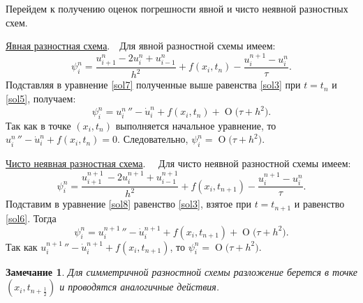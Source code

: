\documentclass[11pt,a4paper,twoside]{report}
\numberwithin{equation}{section}
\theoremstyle{definition}
\theoremstyle{plain}
\newtheorem*{note*}{Замечание}
\newcommand{\bigO}[1]{\ensuremath{\operatorname{O}\bigl(#1\bigr)}}
\begin{document}
\begin{solution}
    \noindent
    Перейдем к получению оценок погрешности явной и чисто неявной разностных схем.

    \underline{Явная разностная схема}.~~Для явной разностной схемы имеем:
    \begin{equation}
        \label{sol7}
        \psi^n_i = \frac{u^{n}_{i+1}-2u^n_i + u^n_{i-1}}{h^2} +
        f(x_i,t_n) - \frac{u^{n+1}_{i}-u^n_i}{\tau}.
    \end{equation}
    Подставляя в уравнение \eqref{sol7} полученные выше равенства \eqref{sol3}
    при $t = t_n$ и \eqref{sol5}, получаем:
    $$
        \psi^n_i = {u^{n~}_i}'' - \dot u^n_i + f(x_i,t_n) + \bigO{\tau + h^2}.
    $$
    Так как в точке $(x_i,t_n)$ выполняется начальное уравнение, то
    ${u^{n~}_i}'' - \dot u^n_i + f(x_i,t_n) = 0$.
    Следовательно, $\psi_i^n = \bigO{\tau + h^2}$.

    \underline{Чисто неявная разностная схема}. ~~Для чисто неявной разностной
    схемы имеем:
    \begin{equation}
        \label{sol8}
        \psi^n_i = \frac{u^{n+1~}_{i+1}-2u^{n+1}_i + u^{n+1}_{i-1}}{h^2} +
        f(x_i,t_{n+1}) - \frac{u^{n+1}_{i}-u^n_i}{\tau}.
    \end{equation}
    Подставим в уравнение \eqref{sol8} равенство \eqref{sol3}, взятое
    при $t = t_{n+1}$ и равенство \eqref{sol6}. Тогда
    $$
        \psi^n_i = {u^{n+1~}_i}'' - \dot u^{n+1}_i + f(x_i,t_{n+1}) + \bigO{\tau + h^2}.
    $$
    Так как ${u^{n+1~}_i}'' - \dot u^{n+1}_i + f(x_i,t_{n+1})$, то
    $\psi_i^n = \bigO{\tau + h^2}$.
    \begin{note*}
        Для симметричной разностной схемы разложение берется в точке
        $(x_i, t_{n+\frac12})$ и проводятся аналогичные действия.
    \end{note*}
%
\end{solution}
%
\end{document}
